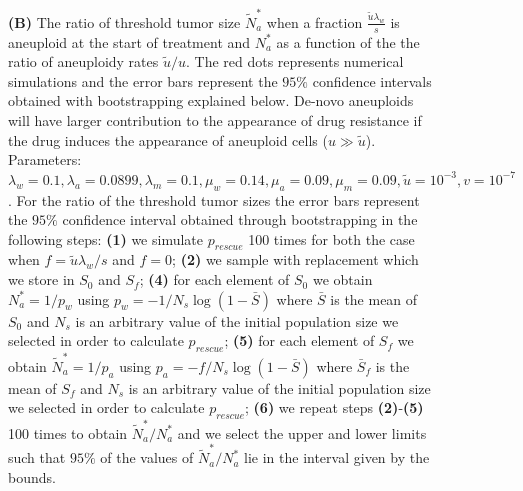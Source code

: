 \documentclass[12pt]{extarticle}
\begin{document}
\begin{figure}
{\textbf{(B)} The ratio of threshold tumor size $\tilde{N}_a^*$ when a fraction $\frac{\tilde{u}\lambda_w}{s}$ is aneuploid at the start of treatment and $N_a^*$ as a function of the the ratio of aneuploidy rates $\tilde{u}/u$. The red dots represents numerical simulations and the error bars represent the $95\%$ confidence intervals obtained with bootstrapping explained below. De-novo aneuploids will have larger contribution to the appearance of drug resistance if the drug induces the appearance of aneuploid cells ($u \gg \tilde u$). Parameters: $\lambda_w=0.1,\lambda_a=0.0899,\lambda_m=0.1,\mu_w=0.14,\mu_a=0.09,\mu_m=0.09,\tilde{u}=10^{-3}, v=10^{-7}$.
For the ratio of the threshold tumor sizes the error bars represent the $95\%$ confidence interval obtained through bootstrapping in the following steps: \textbf{(1)} we simulate $p_{rescue}$ 100 times for both the case when $f=\tilde{u}\lambda_w/s$ and $f=0$; \textbf{(2)} we sample with replacement which we store in $S_0$ and  $S_f$; \textbf{(4)} for each element of $S_0$ we obtain $N_a^*=1/p_w$ using $p_w=-1/N_s\log\left(1-\bar{S}\right)$ where $\bar{S}$ is the mean of $S_0$ and $N_s$ is an arbitrary value of the initial population size we selected in order to calculate $p_{rescue}$; \textbf{(5)} for each element of $S_f$ we obtain $\tilde{N}_a^*=1/p_a$ using $p_a=-f/N_s\log\left(1-\bar{S}\right)$ where $\bar{S}_f$ is the mean of $S_f$ and $N_s$ is an arbitrary value of the initial population size we selected in order to calculate $p_{rescue}$; \textbf{(6)} we repeat steps \textbf{(2)}-\textbf{(5)} 100 times to obtain $\tilde{N}_a^*/N_a^*$ and we select the upper and lower limits such that $95\%$ of the values of $\tilde{N}_a^*/N_a^*$ lie in the interval given by the bounds.
}
\label{rescue_denovo}
\end{figure}
\end{document}
